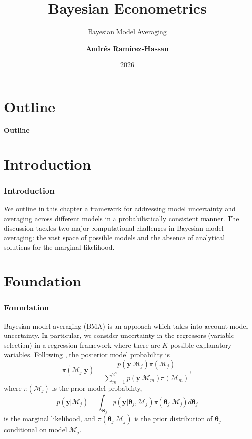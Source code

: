\documentclass[12pt, compress]{beamer}
\title{Bayesian Econometrics}
\subtitle{Bayesian Model Averaging}
\date{2026}
\author[Andr\'e Ram\'irez H.]{\textbf{Andr\'es Ram\'irez-Hassan}}
\institute[EAFIT]{\small{Universidad EAFIT\\School of Finance, Economics and Government}}
\begin{document}
	
	\maketitle
	
	
	
	
	\section*{Outline}
	\begin{frame}
		\textbf{\Large{Outline}}
		\tableofcontents
	\end{frame}
	
\section{Introduction}
	
\begin{frame}
	\frametitle{Introduction}
We outline in this chapter a framework for addressing model uncertainty and averaging across different models in a probabilistically consistent manner. The discussion tackles two major computational challenges in Bayesian model averaging: the vast space of possible models and the absence of analytical solutions for the marginal likelihood.
\end{frame}

\section{Foundation}
\begin{frame}
	\frametitle{Foundation}
Bayesian model averaging (BMA) is an approach which takes into account model uncertainty. In particular, we consider uncertainty in the regressors (variable selection) in a regression framework where there are $K$ possible explanatory variables.
Following \cite{Simmons2010}, the posterior model probability is
\begin{equation*}
	\pi(\mathcal{M}_j |\bm{y})=\frac{p(\bm{y} | \mathcal{M}_j)\pi(\mathcal{M}_j)}{\sum_{m=1}^{2^K}p(\bm{y} | \mathcal{M}_m)\pi(\mathcal{M}_m)},
\end{equation*}
where $\pi(\mathcal{M}_j)$ is the prior model probability,
\begin{equation*}
	p(\bm{y} | \mathcal{M}_j)=\int_{\bm{\Theta}_j} p(\bm{y}| \bm{\theta}_j,\mathcal{M}_j)\pi(\bm{\theta}_j | \mathcal{M}_j) d\bm{\theta}_{j}
\end{equation*}
is the marginal likelihood, and $\pi(\bm{\theta}_j | \mathcal{M}_j)$ is the prior distribution of $\bm{\theta}_j$ conditional on model $\mathcal{M}_j$.
\end{frame}
\end{document}
